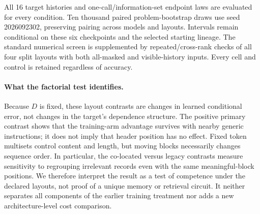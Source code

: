 All 16 target histories and one-call/information-set endpoint laws are evaluated
for every condition. Ten thousand paired problem-bootstrap draws use seed
2026092302, preserving pairing across models and layouts. Intervals remain
conditional on these six checkpoints and the selected starting lineage.
The standard numerical screen is supplemented by repeated/cross-rank checks
of all four split layouts with both all-masked and visible-history inputs.
Every cell and control is retained regardless of accuracy.



\paragraph{What the factorial test identifies.}
Because $D$ is fixed, these layout contrasts are changes in learned conditional
error, not changes in the target's dependence structure. The positive primary
contrast shows that the training-arm advantage survives with nearby
generic instructions; it does not imply that header position has no effect.
Fixed token multisets control content and length, but moving blocks necessarily
changes sequence order. In particular, the co-located versus legacy contrasts
measure sensitivity to regrouping irrelevant records even with the same
meaningful-block positions. We therefore interpret the result as a test of
competence under the declared layouts, not proof of a unique memory or retrieval
circuit. It neither separates all components of the earlier training treatment
nor adds a new architecture-level cost comparison.

